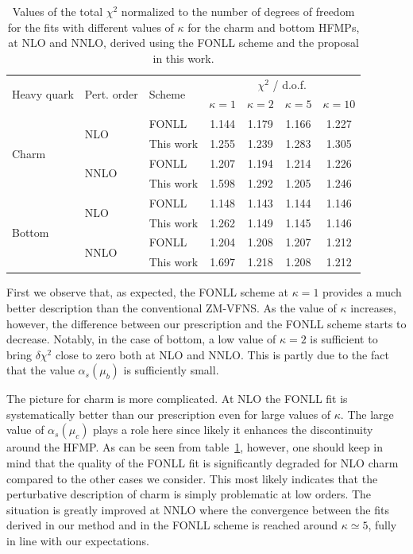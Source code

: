 \documentclass[letter,11pt]{article}
\def\as{\alpha_s}
\def\mub{\mu_b}
\begin{document}
\begin{table}[t]
  \begin{center}
    \begin{tabular}{lllcccc}
      \toprule
      \multirow{2}{*}{Heavy quark} & \multirow{2}{*}{Pert. order} & \multirow{2}{*}{Scheme} & \multicolumn{4}{c}{$\chi^2$ / d.o.f.} \\ 
      & & & $\kappa=1$ & $\kappa=2$ & $\kappa=5$ & $\kappa=10$ \\ 
      \midrule
      \multirow{4}{*}{Charm} & \multirow{2}{*}{NLO} & FONLL &1.144&1.179&1.166&1.227 \\
                 &         & This work &1.255&1.239&1.283&1.305 \\
                 & \multirow{2}{*}{NNLO} & FONLL &1.207&1.194&1.214&1.226 \\
                 &           & This work &1.598&1.292&1.205&1.246 \\
      \midrule
      \multirow{4}{*}{Bottom} & \multirow{2}{*}{NLO} & FONLL &1.148&1.143&1.144&1.146 \\
                 &         & This work &1.262&1.149&1.145&1.146 \\
                 & \multirow{2}{*}{NNLO} & FONLL &1.204&1.208&1.207&1.212 \\
                 &           & This work &1.697&1.218&1.208&1.212 \\
      \bottomrule
    \end{tabular}
  \end{center}
  \caption{Values of the total $\chi^2$ normalized to the number of
    degrees of freedom for the fits with different values of $\kappa$
    for the charm and bottom HFMPs, at NLO and NNLO, derived using
    the FONLL scheme and the proposal in this work.}
\label{tab:chi2}
\end{table}
%



First we observe that, as expected, the FONLL scheme at $\kappa=1$ provides a much better description than the conventional ZM-VFNS. As the value of $\kappa$ increases, however, the difference between our prescription and the FONLL scheme starts to decrease. Notably, in the case of bottom, a low value of $\kappa=2$ is sufficient to bring $\delta\chi^2$ close to zero both at NLO and NNLO. This is partly due to the fact that the value $\as(\mub)$ is sufficiently small. 

The picture for charm is more complicated. At NLO the FONLL fit is systematically better than our prescription even for large values of $\kappa$. The large value of $\as(\mu_c)$ plays a role here since likely it enhances the discontinuity around the HFMP. As can be seen from table~\ref{tab:chi2}, however, one should keep in mind that the quality of the FONLL fit is significantly degraded for NLO charm compared to the other cases we consider. This most likely indicates that the perturbative description of charm is simply problematic at low orders. The situation is greatly improved at NNLO where the convergence between the fits derived in our method and in the FONLL scheme is reached around $\kappa\simeq 5$, fully in line with our expectations.
\end{document}
